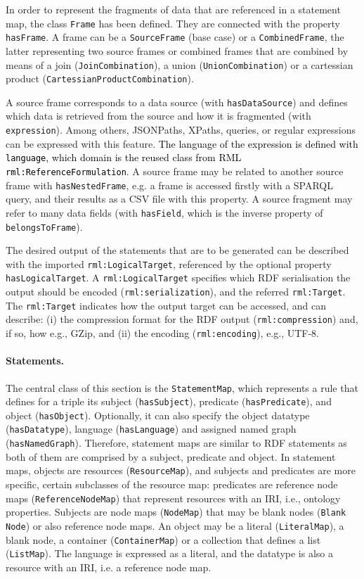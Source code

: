 In order to represent the fragments of data that are referenced in a statement map, the class \texttt{Frame} has been defined. They are connected with the property \texttt{hasFrame}. A frame can be a \texttt{SourceFrame} (base case) or a \texttt{CombinedFrame}, the latter representing two source frames or combined frames that are combined by means of a join (\texttt{JoinCombination}), a union (\texttt{UnionCombination}) or a cartessian product (\texttt{Cartessi\-anProductCombination}). 

A source frame corresponds to a data source (with \texttt{hasDataSource}) and defines which data is retrieved from the source and how it is fragmented (with \texttt{expression}). Among others, JSONPaths, XPaths, queries, or regular expressions can be expressed with this feature. \textcolor{black}{The language of the expression is defined with \texttt{language}, which domain is the reused class from RML \texttt{rml:ReferenceFormulation}}. A source frame may be related to another source frame with  \texttt{hasNest\-edFrame}, e.g. a frame is accessed firstly with a SPARQL query, and their results as a CSV file with this property. A source fragment may refer to many data fields (with \texttt{hasField}, which is the inverse property of \texttt{belongsToFrame}).

The desired output of the statements that are to be generated can be described with the imported \texttt{rml:LogicalTarget}, referenced by the optional property \texttt{hasLogicalTarget}. A \texttt{rml:LogicalTarget} specifies which RDF serialisation the output should be encoded (\texttt{rml:serialization}), and the referred \texttt{rml:Target}. 
The \texttt{rml:Target} indicates how the output target can be accessed,
and can describe: (i) the compression format for the RDF output (\texttt{rml:compression}) and, if so, how e.g., GZip,
and (ii) the encoding (\texttt{rml:encoding}), e.g., UTF-8.

\noindent\paragraph{\textbf{Statements.}} The central class of this section is the \texttt{StatementMap}, which represents a rule that defines for a triple its subject (\texttt{hasSubject}), predicate (\texttt{hasPredicate}), and object (\texttt{hasObject}). Optionally, it can also specify the object datatype (\texttt{hasDatatype}), language (\texttt{hasLanguage}) and assigned named graph (\texttt{hasNamedGraph}). Therefore, statement maps are similar to RDF statements as both of them are comprised by a subject, predicate and object. In statement maps, objects are resources (\texttt{ResourceMap}), and subjects and predicates are more specific, certain subclasses of the resource map: predicates are reference node maps (\texttt{ReferenceNodeMap}) that represent resources with an IRI, i.e., ontology properties. Subjects are node maps (\texttt{NodeMap}) that may be blank nodes (\texttt{Blank Node}) or also reference node maps. An object may be a literal (\texttt{LiteralMap}), a blank node, a container (\texttt{ContainerMap}) or a collection that defines a list (\texttt{ListMap}). The language is expressed as a literal, and the datatype is also a resource with an IRI, i.e. a reference node map.

